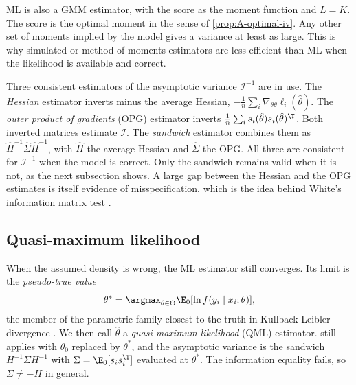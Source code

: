ML is also a GMM estimator, with the score as the moment function and $L = K$. The score is the optimal moment in the sense
of \cref{prop:A-optimal-iv}. Any other set of moments implied by the model gives a variance at least as large. This is
why simulated or method-of-moments estimators are less efficient than ML when the likelihood is available and correct.

Three consistent estimators of the asymptotic variance $\mathcal{I}^{-1}$ are in use. The \emph{Hessian} estimator
inverts minus the average Hessian, $-\frac{1}{n}\sum_i\nabla_{\theta\theta}\ell_i(\hat\theta)$. The \emph{outer product
of gradients} (OPG) estimator inverts $\frac{1}{n}\sum_is_i(\hat\theta)s_i(\hat\theta)^\T$. Both inverted matrices
estimate $\mathcal{I}$. The \emph{sandwich} estimator combines them as $\hat H^{-1}\hat\Sigma\hat H^{-1}$, with $\hat H$
the average Hessian and $\hat\Sigma$ the OPG. All three are consistent for $\mathcal{I}^{-1}$ when the model is correct. Only the sandwich remains valid when it is not, as the next subsection shows. A large gap
between the Hessian and the OPG estimates is itself evidence of misspecification, which is the idea behind White's
information matrix test \citep{White1982}.

\subsection{Quasi-maximum likelihood}\label{sec:A-qmle}

When the assumed density is wrong, the ML estimator still converges. Its limit is the \emph{pseudo-true value}
\begin{equation*}
  \theta^* = \argmax_{\theta \in \Theta}\E_0[\ln f(y_i \mid x_i;\theta)],
\end{equation*}
the member of the parametric family closest to the truth in Kullback-Leibler divergence \citep{White1982}. We then call
$\hat\theta$ a \emph{quasi-maximum likelihood} (QML) estimator.  still applies with $\theta_0$
replaced by $\theta^*$, and the asymptotic variance is the sandwich $H^{-1}\Sigma H^{-1}$ with
$\Sigma = \E_0[s_is_i^\T]$ evaluated at $\theta^*$. The information equality fails, so $\Sigma \ne -H$ in general.

